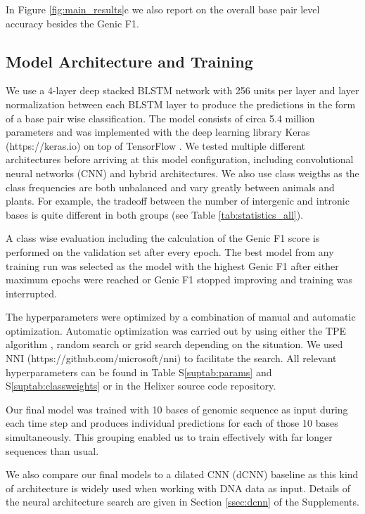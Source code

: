 \documentclass{bioinfo}
\newcounter{suptab}
\begin{document}
\begin{methods}
In Figure \ref{fig:main_results}c we also report on the overall base pair level 
accuracy besides the Genic F1.

\subsection{Model Architecture and Training}
\label{sec:model}
We use a 4-layer deep stacked BLSTM network with 256 units per layer and layer 
normalization \citep{ba2016layer} between each BLSTM layer to produce the 
predictions in the form of a base pair wise classification. The model consists of 
circa 5.4 million parameters and was implemented with the deep learning library 
Keras (https://keras.io) on top of TensorFlow \citep{abadi2016tensorflow}. We 
tested multiple different architectures before arriving at this model configuration, 
including convolutional neural networks (CNN) and hybrid architectures. We also use 
class weigths as the class frequencies are both unbalanced and 
vary greatly between animals and plants. 
For example, the tradeoff between the number of intergenic and intronic bases is 
quite different in both groups (see Table \ref{tab:statistics_all}). 

A class wise evaluation including the calculation of the Genic 
F1 score is performed on the validation set after every epoch. The best model
from any training run was selected as the model with the highest Genic F1 after either
maximum epochs were reached or Genic F1 stopped improving and training was interrupted.

The hyperparameters were optimized by a combination of manual and automatic 
optimization. Automatic optimization was carried out by using either the TPE 
algorithm \citep{bergstra2011algorithms}, random search or grid search depending on 
the situation. We used NNI (https://github.com/microsoft/nni) to facilitate the search. All relevant 
hyperparameters can be found in Table S\ref{suptab:params} and 
S\ref{suptab:classweights} or in the Helixer source code repository. 
	
Our final model was trained with 10 bases of genomic sequence as input during each 
time step and produces individual predictions for each of those 10 bases 
simultaneously. This grouping enabled us to train effectively with far longer 
sequences than usual. 

We also compare our final models to a dilated CNN (dCNN) baseline as this kind of architecture is 
widely used when working with DNA data as input. Details of the neural architecture 
search are given in Section \ref{ssec:dcnn} of the Supplements.


\end{methods}
\end{document}
